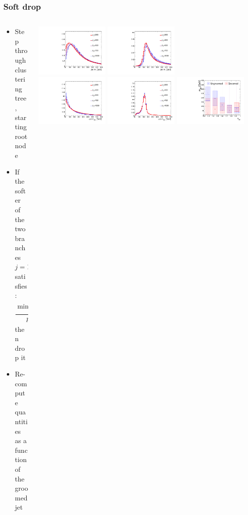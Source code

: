 \documentclass[aspectratio=169,xcolor=dvipsnames,,table,compress]{beamer}
\begin{document}
\begin{frame} \frametitle{Soft drop}
  \begin{columns}
    \begin{column}{0.4\textwidth}
      \begin{itemize}
        \item Step through clustering tree, starting root node
        \item If the softer of the two branches $j=1,2$ satisfies:
          \[
            \frac{\min(p_\mathrm{T,1},p_\mathrm{T,2})}{p_\mathrm{T,1}+p_\mathrm{T,2}} < 
            \left(\frac{\Delta R_{12}}{R}\right)^\beta
          \]
          then drop it 
        \item Re-compute quantities as a function of the groomed jet
      \end{itemize}
    \end{column}
    \begin{column}{0.6\textwidth}
          \includegraphics[width=0.32\textwidth]{../figures/toptagging/gen/norm_clf_M_QCD.pdf}
          \includegraphics[width=0.32\textwidth]{../figures/toptagging/gen/norm_clf_M_ZpTT_lo.pdf}\\
          \includegraphics[width=0.32\textwidth]{../figures/toptagging/gen/norm_clf_MSD_QCD.pdf}
          \includegraphics[width=0.32\textwidth]{../figures/toptagging/gen/norm_clf_MSD_ZpTT_lo.pdf}
          \includegraphics[width=0.32\textwidth]{../figures/toptagging/gen/msdtau_QCD.pdf}
    \end{column}
  \end{columns}
\end{frame}
\end{document}
